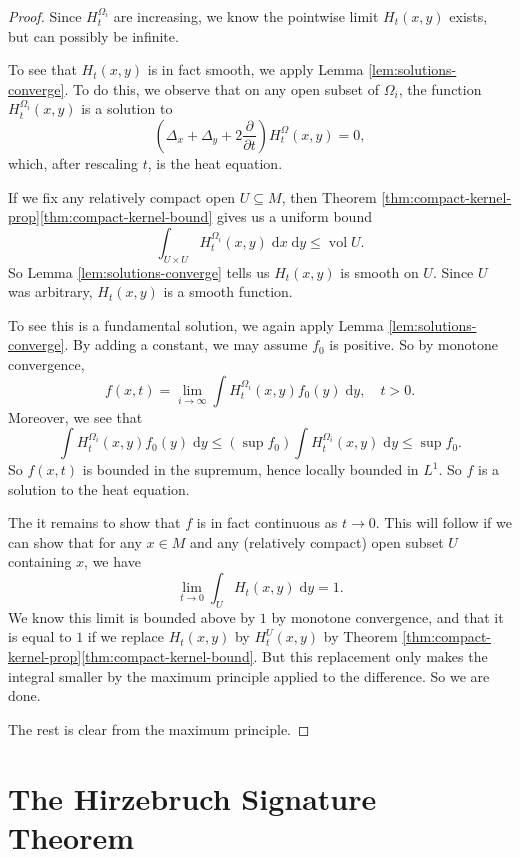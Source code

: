 \documentclass{shortart}
\theoremstyle{definition}
\renewcommand\d{\mathrm{d}}
\DeclareMathOperator\vol{vol}
\begin{document}
\begin{proof}
  Since $H_t^{\Omega_i}$ are increasing, we know the pointwise limit $H_t(x, y)$ exists, but can possibly be infinite.

  To see that $H_t(x, y)$ is in fact smooth, we apply Lemma \ref{lem:solutions-converge}. To do this, we observe that on any open subset of $\Omega_i$, the function $H_t^{\Omega_i}(x, y)$ is a solution to
  \[
    \left(\Delta_x + \Delta_y + 2\frac{\partial}{\partial t}\right) H_t^\Omega(x, y) = 0,
  \]
  which, after rescaling $t$, is the heat equation.

  If we fix any relatively compact open $U \subseteq M$, then Theorem \ref{thm:compact-kernel-prop}\ref{thm:compact-kernel-bound} gives us a uniform bound
  \[
    \int_{U \times U} H_t^{\Omega_i}(x, y)\;\d x\;\d y \leq \vol U.
  \]
  So Lemma \ref{lem:solutions-converge} tells us $H_t(x, y)$ is smooth on $U$. Since $U$ was arbitrary, $H_t(x, y)$ is a smooth function.

  To see this is a fundamental solution, we again apply Lemma \ref{lem:solutions-converge}. By adding a constant, we may assume $f_0$ is positive. So by monotone convergence,
  \[
    f(x, t) = \lim_{i \to \infty} \int H_t^{\Omega_i}(x, y) f_0(y)\;\d y,\quad t > 0.
  \]
  Moreover, we see that
  \[
    \int H_t^{\Omega_i}(x, y) f_0(y)\;\d y \leq \left(\sup f_0\right) \int H_t^{\Omega_i}(x, y) \;\d y \leq \sup f_0.
  \]
  So $f(x, t)$ is bounded in the supremum, hence locally bounded in $L^1$. So $f$ is a solution to the heat equation.

  The it remains to show that $f$ is in fact continuous as $t \to 0$. This will follow if we can show that for any $x \in M$ and any (relatively compact) open subset $U$ containing $x$, we have
  \[
    \lim_{t \to 0} \int_U H_t(x, y) \;\d y = 1.
  \]
  We know this limit is bounded above by $1$ by monotone convergence, and that it is equal to $1$ if we replace $H_t(x, y)$ by $H_t^U(x, y)$ by Theorem \ref{thm:compact-kernel-prop}\ref{thm:compact-kernel-bound}. But this replacement only makes the integral smaller by the maximum principle applied to the difference. So we are done.

  The rest is clear from the maximum principle.
\end{proof}

\section{The Hirzebruch Signature Theorem}\label{section:hirzebruch}
\end{document}
